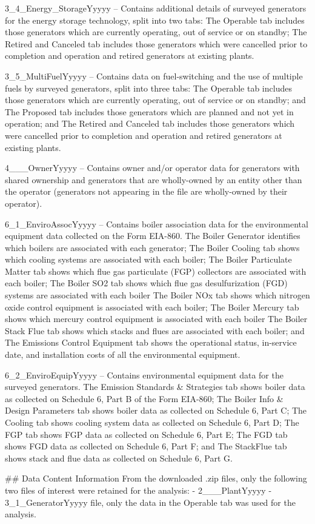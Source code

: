 3_4_Energy_StorageYyyyy – Contains additional details of surveyed generators for the energy storage technology, split into two tabs:
The Operable tab includes those generators which are currently operating, out of service or on standby;
The Retired and Canceled tab includes those generators which were cancelled prior to completion and operation and retired generators at existing plants.

3_5_MultiFuelYyyyy – Contains data on fuel-switching and the use of multiple fuels by surveyed generators, split into three tabs:
The Operable tab includes those generators which are currently operating, out of service or on standby; and
The Proposed tab includes those generators which are planned and not yet in operation; and
The Retired and Canceled tab includes those generators which were cancelled prior to completion and operation and retired generators at existing plants.

4___OwnerYyyyy – Contains owner and/or operator data for generators with shared ownership and generators that are wholly-owned by an entity other than the operator (generators not appearing in the file are wholly-owned by their operator).

6_1_EnviroAssocYyyyy – Contains boiler association data for the environmental equipment data collected on the Form EIA-860.
The Boiler Generator identifies which boilers are associated with each generator;
The Boiler Cooling tab shows which cooling systems are associated with each boiler;
The Boiler Particulate Matter tab shows which flue gas particulate (FGP) collectors are associated with each boiler;
The Boiler SO2 tab shows which flue gas desulfurization (FGD) systems are associated with each boiler
The Boiler NOx tab shows which nitrogen oxide control equipment is associated with each boiler;
The Boiler Mercury tab shows which mercury control equipment is associated with each boiler
The Boiler Stack Flue tab shows which stacks and flues are associated with each boiler; and
The Emissions Control Equipment tab shows the operational status, in-service date, and installation costs of all the environmental equipment.

6_2_EnviroEquipYyyyy – Contains environmental equipment data for the surveyed generators.
The Emission Standards & Strategies tab shows boiler data as collected on Schedule 6, Part B of the Form EIA-860;
The Boiler Info & Design Parameters tab shows boiler data as collected on Schedule 6, Part C;
The Cooling tab shows cooling system data as collected on Schedule 6, Part D;
The FGP tab shows FGP data as collected on Schedule 6, Part E;
The FGD tab shows FGD data as collected on Schedule 6, Part F; and
The StackFlue tab shows stack and flue data as collected on Schedule 6, Part G.


## Data Content Information
From the downloaded .zip files, only the following two files of interest were retained for the analysis: 
- 2___PlantYyyyy 
- 3_1_GeneratorYyyyy file, only the data in the Operable tab was used for the analysis.

